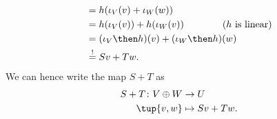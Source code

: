 \begin{example}
\begin{equation*}
\begin{aligned}
            &=h(\iota_V(v)+\iota_W(w)) \\
            &=h(\iota_V(v))+h(\iota_W(v)) \qquad \qquad (h \text{ is linear})\\
            &=(\iota_V\then h)(v)+(\iota_W\then h)(w)\\
            &\overset{!}{=}Sv+Tw.
        \end{aligned}
    \end{equation*}
    We can hence write the map $S+T$ as
    \begin{equation*}
        \begin{aligned}
            S+T\colon V\oplus W&\to U\\
            \tup{v,w}&\mapsto Sv+Tw.
        \end{aligned}
    \end{equation*}
\end{example}



